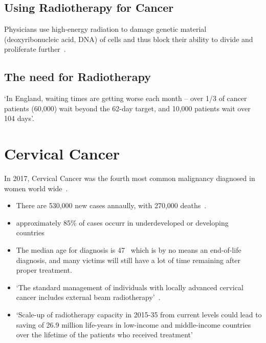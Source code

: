 \documentclass[11pt]{article}
\begin{document}
\subsection{Using Radiotherapy for Cancer}

Physicians use high-energy radiation to damage genetic material (deoxyribonucleic acid, DNA) of cells and thus block their ability to divide and proliferate further~\cite{radiotherapy-advances}.

\subsection{The need for Radiotherapy}


`In England, waiting times are getting worse each month – over 1/3 of cancer patients (60,000) wait beyond the 62-day target, and 10,000 patients wait over 104 days'.
 
\section{Cervical Cancer}

In 2017, Cervical Cancer was the fourth most common malignancy diagnosed in women world wide~\cite{cervical-cancer-epidemic}.

\begin{itemize}
    \item There are 530,000 new cases annaully, with 270,000 deaths~\cite{cervical-cancer-epidemic}.
    \item approximately 85\% of cases occurr in underdeveloped or developing countries~\cite{cervical-cancer-epidemic}
    \item The median age for diagnosis is 47~\cite{cervical-cancer-epidemic} which is by no means an end-of-life diagnosis, and many victims will still have a lot of time remaining after proper treatment.
    \item `The standard management of individuals with locally advanced cervical cancer includes external beam radiotherapy'~\cite{cervical-cancer-epidemic}.
    \item `Scale-up of radiotherapy capacity in 2015-35 from current levels could lead to saving of 26.9 million life-years in low-income and middle-income countries over the lifetime of the patients who received treatment'~\cite{expanding-global-access-to-radiotherapy}
\end{itemize}

\printbibliography
\end{document}
